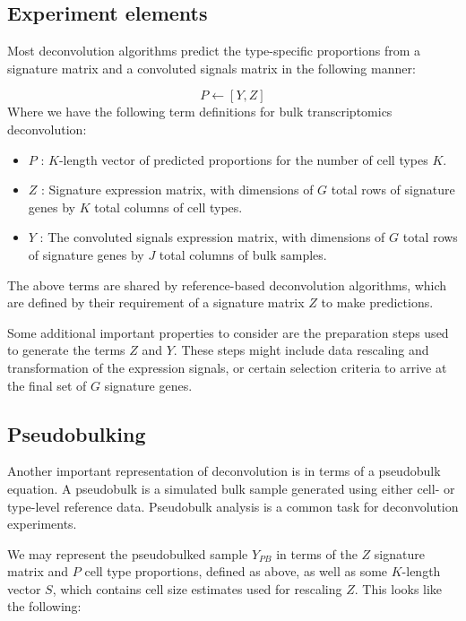 \documentclass[]{article}
\begin{document}
\hypertarget{experiment-elements}{%
\subsection{Experiment elements}\label{experiment-elements}}

Most deconvolution algorithms predict the type-specific proportions from a
signature matrix and a convoluted signals matrix in the following manner:

\[P \leftarrow [Y, Z]\]
Where we have the following term definitions for bulk transcriptomics deconvolution:

\begin{itemize}
\item
  \(P\) : \(K\)-length vector of predicted proportions for the number of cell types \(K\).
\item
  \(Z\) : Signature expression matrix, with dimensions of \(G\) total rows of
  signature genes by \(K\) total columns of cell types.
\item
  \(Y\) : The convoluted signals expression matrix, with dimensions of \(G\) total
  rows of signature genes by \(J\) total columns of bulk samples.
\end{itemize}

The above terms are shared by reference-based deconvolution algorithms, which
are defined by their requirement of a signature matrix \(Z\) to make predictions.

Some additional important properties to consider are the preparation steps used
to generate the terms \(Z\) and \(Y\). These steps might include data rescaling and
transformation of the expression signals, or certain selection criteria to
arrive at the final set of \(G\) signature genes.

\hypertarget{pseudobulking}{%
\subsection{Pseudobulking}\label{pseudobulking}}

Another important representation of deconvolution is in terms of a pseudobulk
equation. A pseudobulk is a simulated bulk sample generated using either cell-
or type-level reference data. Pseudobulk analysis is a common task for
deconvolution experiments.

We may represent the pseudobulked sample \(Y_{PB}\) in terms of the \(Z\) signature
matrix and \(P\) cell type proportions, defined as above, as well as some
\(K\)-length vector \(S\), which contains cell size estimates used for rescaling
\(Z\). This looks like the following:
\end{document}
